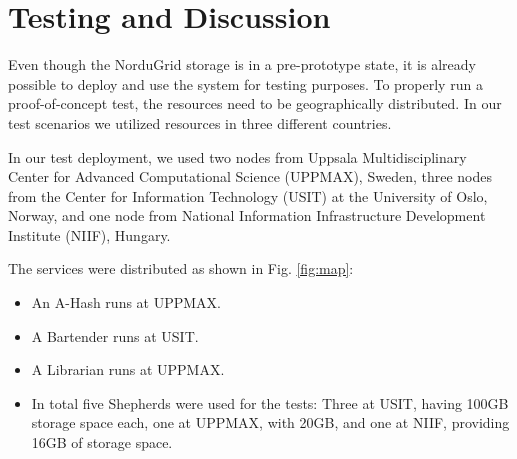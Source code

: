 \documentclass[final]{ieee}
\begin{document}
\section{Testing and Discussion}
\label{Testing and Discussion}

Even though the NorduGrid storage is in a pre-prototype state, it is already
possible to deploy and use the system for testing purposes. To
properly run a proof-of-concept test, the resources need to be
geographically distributed. In our test scenarios we utilized
resources in three different countries.

In our test deployment, we used two nodes from Uppsala
Multidisciplinary Center for Advanced Computational Science (UPPMAX), Sweden, 
three nodes from the Center for Information Technology (USIT) at the
University of Oslo, Norway, 
and one node from National Information Infrastructure Development Institute (NIIF),
Hungary. %

The services were distributed as shown in Fig. \ref{fig:map}:
\begin{itemize}
\item An A-Hash runs at UPPMAX.
\item A Bartender runs at USIT.
\item A Librarian runs at UPPMAX.
\item In total five Shepherds were used for the tests: Three at USIT, having
  100GB storage space each, one at UPPMAX, with 20GB, and one at NIIF, providing 16GB of storage space.
 \end{itemize}
\end{document}
